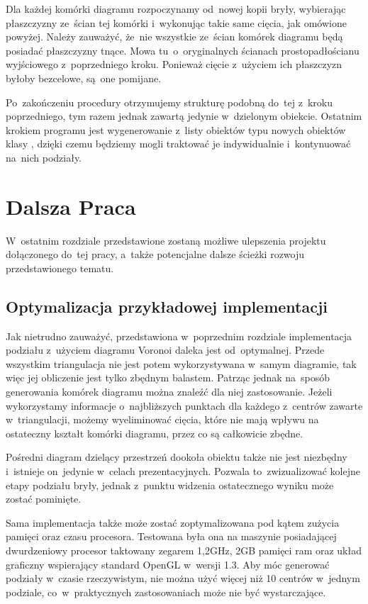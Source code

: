 \documentclass[skorowidz,autorrok,backref,xodstep,oswiadczenie]{wmimgr}
\begin{document}
Dla każdej komórki diagramu rozpoczynamy od~nowej kopii bryły, wybierając płaszczyzny ze~ścian tej komórki i~wykonując takie same cięcia, jak omówione powyżej. Należy zauważyć, że~nie wszystkie ze~ścian komórek diagramu będą posiadać płaszczyzny tnące. Mowa tu~o~oryginalnych ścianach prostopadłościanu wyjściowego z~poprzedniego kroku. Ponieważ cięcie z~użyciem ich płaszczyzn byłoby bezcelowe, są~one pomijane.

Po~zakończeniu procedury otrzymujemy strukturę podobną do~tej z~kroku poprzedniego, tym razem jednak zawartą jedynie w~dzielonym obiekcie. Ostatnim krokiem programu jest wygenerowanie z~listy obiektów typu  nowych obiektów klasy , dzięki czemu będziemy mogli traktować je indywidualnie i~kontynuować na~nich podziały.

\chapter{Dalsza Praca}

W~ostatnim rozdziale przedstawione zostaną możliwe ulepszenia projektu dołączonego do~tej pracy, a~także potencjalne dalsze ścieżki rozwoju przedstawionego tematu.

\section{Optymalizacja przykładowej implementacji}

Jak nietrudno zauważyć, przedstawiona w~poprzednim rozdziale implementacja podziału z~użyciem diagramu Voronoi daleka jest od~optymalnej. Przede wszystkim triangulacja nie jest potem wykorzystywana w~samym diagramie, tak więc jej obliczenie jest tylko zbędnym balastem. Patrząc jednak na~sposób generowania komórek diagramu można znaleźć dla niej zastosowanie. Jeżeli wykorzystamy informacje o~najbliższych punktach dla każdego z~centrów zawarte w~triangulacji, możemy wyeliminować cięcia, które nie mają wpływu na ostateczny kształt komórki diagramu, przez co są całkowicie zbędne.

Pośredni diagram dzielący przestrzeń dookoła obiektu także nie jest niezbędny i~istnieje on~jedynie w~celach prezentacyjnych. Pozwala to~zwizualizować kolejne etapy podziału bryły, jednak z~punktu widzenia ostatecznego wyniku może zostać pominięte.

Sama implementacja także może zostać zoptymalizowana pod kątem zużycia pamięci oraz czasu procesora. Testowana była ona na maszynie posiadającej dwurdzeniowy procesor taktowany zegarem 1,2GHz, 2GB pamięci ram oraz układ graficzny wspierający standard OpenGL w~wersji 1.3. Aby móc generować podziały w~czasie rzeczywistym, nie można użyć więcej niż 10 centrów w~jednym podziale, co~w~praktycznych zastosowaniach może nie być wystarczające.
\end{document}
